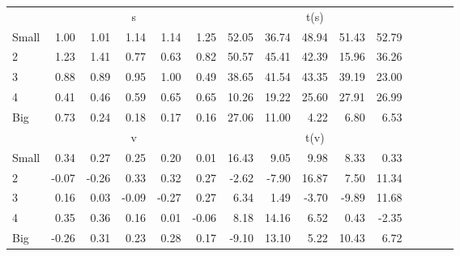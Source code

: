 \begin{table}[!ht]
\begin{tabular}{lrrrrrrrrrrrrrr}
      & \multicolumn{5}{c}{s} & \multicolumn{5}{c}{t(s)}
    
    \\
      \cmidrule(r){2-6} \cmidrule(r){7-11}

    Small   & 1.00  & 1.01  & 1.14  & 1.14  & 1.25  & 52.05  & 36.74  & 48.94  & 51.43  & 52.79  \\
         2  & 1.23  & 1.41  & 0.77  & 0.63  & 0.82  & 50.57  & 45.41  & 42.39  & 15.96  & 36.26  \\
         3  & 0.88  & 0.89  & 0.95  & 1.00  & 0.49  & 38.65  & 41.54  & 43.35  & 39.19  & 23.00  \\
         4  & 0.41  & 0.46  & 0.59  & 0.65  & 0.65  & 10.26  & 19.22  & 25.60  & 27.91  & 26.99  \\
    Big     & 0.73  & 0.24  & 0.18  & 0.17  & 0.16  & 27.06  & 11.00  & 4.22  & 6.80  & 6.53  \\

  
    
      & \multicolumn{5}{c}{v} & \multicolumn{5}{c}{t(v)}
    
    \\
      \cmidrule(r){2-6} \cmidrule(r){7-11}

    Small   & 0.34  & 0.27  & 0.25  & 0.20  & 0.01  & 16.43  & 9.05  & 9.98  & 8.33  & 0.33  \\
         2  & -0.07  & -0.26  & 0.33  & 0.32  & 0.27  & -2.62  & -7.90  & 16.87  & 7.50  & 11.34  \\
         3  & 0.16  & 0.03  & -0.09  & -0.27  & 0.27  & 6.34  & 1.49  & -3.70  & -9.89  & 11.68  \\
         4  & 0.35  & 0.36  & 0.16  & 0.01  & -0.06  & 8.18  & 14.16  & 6.52  & 0.43  & -2.35  \\
    Big     & -0.26  & 0.31  & 0.23  & 0.28  & 0.17  & -9.10  & 13.10  & 5.22  & 10.43  & 6.72  \\

  

  \bottomrule
\end{tabular}
\label{tbl:25_Size_NI_F93}
\end{table}